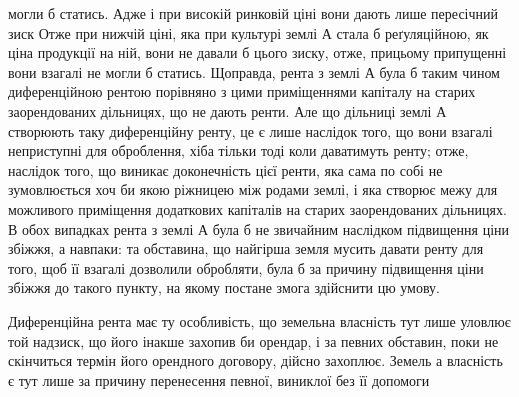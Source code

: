 могли б статись. Адже і при високій ринковій ціні вони дають лише пересічний
зиск Отже при нижчій ціні, яка при культурі землі $А$ стала б реґуляційною,
як ціна продукції на ній, вони не давали б цього зиску, отже, прицьому
припущенні вони взагалі не могли б статись. Щоправда, рента з землі
$А$ була б таким чином диференційною рентою порівняно з цими приміщеннями
капіталу на старих заорендованих дільницях, що не дають ренти. Але
що дільниці землі $А$ створюють таку диференційну ренту, це є лише наслідок
того, що вони взагалі неприступні для оброблення, хіба тільки тоді коли
даватимуть ренту; отже, наслідок того, що виникає доконечність цієї ренти, яка
сама по собі не зумовлюється хоч би якою ріжницею між родами землі, і яка
створює межу для можливого приміщення додаткових капіталів на старих заорендованих
дільницях. В обох випадках рента з землі $А$ була б не звичайним
наслідком підвищення ціни збіжжя, а навпаки: та обставина, що найгірша
земля мусить давати ренту для того, щоб її взагалі дозволили обробляти, була б
за причину підвищення ціни збіжжя до такого пункту, на якому постане змога
здійснити цю умову.

Диференційна рента має ту особливість, що земельна власність тут лише
уловлює той надзиск, що його інакше захопив би орендар, і за певних обставин,
поки не скінчиться термін його орендного договору, дійсно захоплює. Земель а
власність є тут лише за причину перенесення певної, виниклої без її допомоги
\parbreak{}  %
